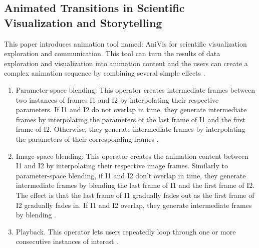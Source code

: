 \documentclass{egpubl}
\begin{document}
\subsection{Animated Transitions in Scientific Visualization and Storytelling}
This paper introduces animation tool named: AniVis for scientific visualization exploration and communication. This tool can turn the results of data exploration and visualization into animation content and the users can create a complex animation sequence by combining several simple effects \cite{Akiba}.
\begin{enumerate}
\item Parameter-space blending: This operator creates intermediate frames between two instances of frames I1 and I2 by interpolating their respective parameters. If I1 and I2 do not overlap in time, they generate intermediate frames by interpolating the parameters of the last frame of I1 and the first frame of I2. Otherwise, they generate intermediate frames by interpolating the parameters of their corresponding frames \cite{Akiba}.

\item Image-space blending: This operator creates the animation content between I1 and I2 by interpolating their respective image frames. Similarly to parameter-space blending, if I1 and I2 don't overlap in time, they generate intermediate frames by blending the last frame of I1 and the first frame of I2. The effect is that the last frame of I1 gradually fades out as the first frame of I2 gradually fades in. If I1 and I2 overlap, they generate intermediate frames by blending \cite{Akiba}.

\item Playback. This operator lets users repeatedly loop through one or more consecutive instances of interest \cite{Akiba}.

\end{enumerate}
\end{document}
